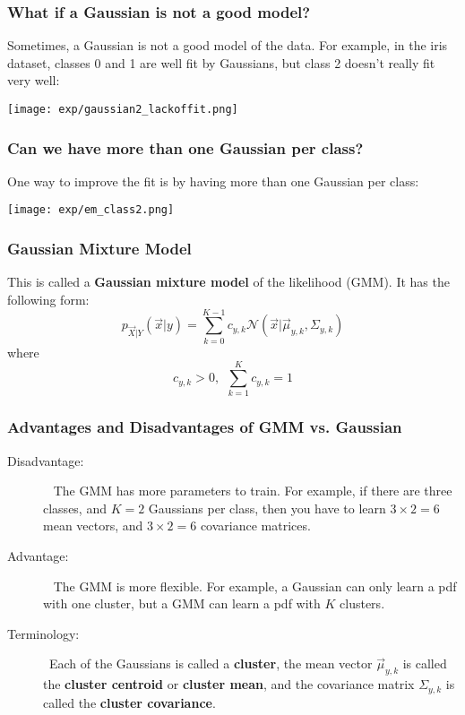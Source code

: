 \documentclass{beamer}
\begin{document}
\begin{frame}
  \frametitle{What if a Gaussian is not a good model?}

  Sometimes, a Gaussian is not a good model of the data.  For example,
  in the iris dataset, classes 0 and 1 are well fit by Gaussians, but
  class 2 doesn't really fit very well:
  \centerline{\texttt{[image: exp/gaussian2\_lackoffit.png]}}
\end{frame}

\begin{frame}
  \frametitle{Can we have more than one Gaussian per class?}

  One way to improve the fit is by having more than one Gaussian per class:
  \centerline{\texttt{[image: exp/em\_class2.png]}}
\end{frame}

\begin{frame}
  \frametitle{Gaussian Mixture Model}

  This is called a {\bf Gaussian mixture model} of the likelihood
  (GMM).  It has the following form:
  \begin{displaymath}
    p_{\vec{X}|Y}(\vec{x}|y)
    = \sum_{k=0}^{K-1} c_{y,k} {\mathcal N}(\vec{x}|\vec\mu_{y,k},\Sigma_{y,k})
  \end{displaymath}
  where
  \begin{displaymath}
    c_{y,k}>0,~~\sum_{k=1}^K c_{y,k}=1
  \end{displaymath}
\end{frame}

\begin{frame}
  \frametitle{Advantages and Disadvantages of GMM vs. Gaussian}

  \begin{description}
  \item[Disadvantage:]~ The GMM has more parameters to train.  For
    example, if there are three classes, and $K=2$ Gaussians per
    class, then you have to learn $3\times 2=6$ mean vectors, and
    $3\times 2=6$ covariance matrices.  
  \item[Advantage:]~ The GMM is more flexible.  For example, a
    Gaussian can only learn a pdf with one cluster, but a GMM can learn a
    pdf with $K$ clusters.
  \item[Terminology:]~Each of the Gaussians is called a {\bf cluster},
    the mean vector $\vec\mu_{y,k}$ is called the {\bf cluster
      centroid} or {\bf cluster mean}, and the covariance matrix
    $\Sigma_{y,k}$ is called the {\bf cluster covariance}.
  \end{description}
\end{frame}
\end{document}
